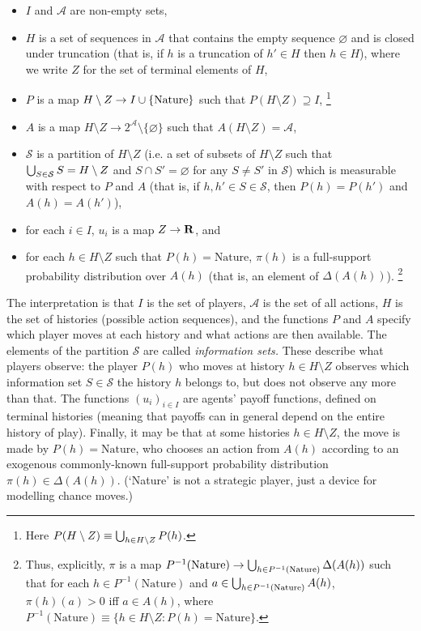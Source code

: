 \documentclass[11pt,letterpaper,reqno,oneside]{book}
\begin{document}
\begin{itemize}

	\item $I$ and $\mathcal{A}$ are non-empty sets,

	\item $H$ is a set of sequences in $\mathcal{A}$ that contains the empty sequence $\varnothing$ and is closed under truncation (that is, if $h$ is a truncation of $h' \in H$ then $h \in H$), where we write $Z$ for the set of terminal elements of $H$,

	\item $P$ is a map $H \setminus Z \to I \cup \{\text{Nature}\}$ such that $P(H \setminus Z) \supseteq I$,%
		\footnote{Here $P(H \setminus Z) \equiv \bigcup_{h \in H \setminus Z} P(h)$.}

	\item $A$ is a map $H \setminus Z \to 2^\mathcal{A} \setminus \{\varnothing\}$ such that $A(H \setminus Z) = \mathcal{A}$,

	\item $\mathcal{S}$ is a partition of $H \setminus Z$ (i.e. a set of subsets of $H \setminus Z$ such that $\bigcup_{S \in \mathcal{S}} S = H \setminus Z$ and $S \cap S' = \varnothing$ for any $S \neq S'$ in $\mathcal{S}$) which is measurable with respect to $P$ and $A$ (that is, if $h,h' \in S \in \mathcal{S}$, then $P(h)=P(h')$ and $A(h)=A(h')$),

	\item for each $i \in I$, $u_i$ is a map $Z \to \mathbf{R}$, and

	\item for each $h \in H \setminus Z$ such that $P(h) = \text{Nature}$, $\pi(h)$ is a full-support probability distribution over $A(h)$ (that is, an element of $\Delta(A(h))$).%
		\footnote{Thus, explicitly, $\pi$ is a map $P^{-1}(\text{Nature}) \to \bigcup_{h \in P^{-1}(\text{Nature})} \Delta(A(h))$ such that for each $h \in P^{-1}(\text{Nature})$ and $a \in \bigcup_{h \in P^{-1}(\text{Nature})} A(h)$, $\pi(h)(a)>0$ iff $a \in A(h)$, where $P^{-1}(\text{Nature}) \equiv \{ h \in H \setminus Z : P(h) = \text{Nature} \}$.}

\end{itemize}
%
The interpretation is that $I$ is the set of players, $\mathcal{A}$ is the set of all actions, $H$ is the set of histories (possible action sequences), and the functions $P$ and $A$ specify which player moves at each history and what actions are then available. The elements of the partition $\mathcal{S}$ are called \emph{information sets.} These describe what players observe: the player $P(h)$ who moves at history $h \in H \setminus Z$ observes which information set $S \in \mathcal{S}$ the history $h$ belongs to, but does not observe any more than that. The functions $(u_i)_{i \in I}$ are agents' payoff functions, defined on terminal histories (meaning that payoffs can in general depend on the entire history of play). Finally, it may be that at some histories $h \in H \setminus Z$, the move is made by $P(h) = \text{Nature}$, who chooses an action from $A(h)$ according to an exogenous commonly-known full-support probability distribution $\pi(h) \in \Delta(A(h))$. (`Nature' is not a strategic player, just a device for modelling chance moves.)
\end{document}
